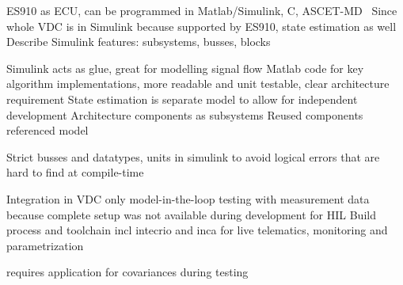 ES910 as ECU, can be programmed in Matlab/Simulink, C, ASCET-MD~\cite[p.~17]{ETASGmbHStuttgart.2018}
Since whole VDC is in Simulink because supported by ES910, state estimation as well
Describe Simulink features: subsystems, busses, blocks

Simulink acts as glue, great for modelling signal flow
Matlab code for key algorithm implementations, more readable and unit testable, clear architecture requirement
State estimation is separate model to allow for independent development
Architecture components as subsystems
Reused components referenced model

Strict busses and datatypes, units in simulink to avoid logical errors that are hard to find at compile-time

Integration in VDC
only model-in-the-loop testing with measurement data because complete setup was not available during development for HIL
Build process and toolchain incl intecrio and inca for live telematics, monitoring and parametrization

requires application for covariances during testing
